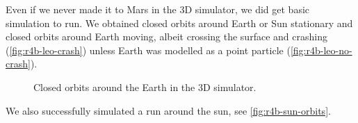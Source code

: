Even if we never made it to Mars in the 3D simulator, we did get basic simulation to run. We obtained closed orbits around Earth or Sun stationary and closed orbits around Earth moving, albeit crossing the surface and crashing (\cref{fig:r4b-leo-crash}) unless Earth was modelled as a point particle (\cref{fig:r4b-leo-no-crash}).

\begin{figure}[ht]
    \centering
    \hfill
    \caption{Closed orbits around the Earth in the 3D simulator.}
    \label{fig:}
\end{figure} 

We also successfully simulated a run around the sun, see \cref{fig:r4b-sun-orbits}.

